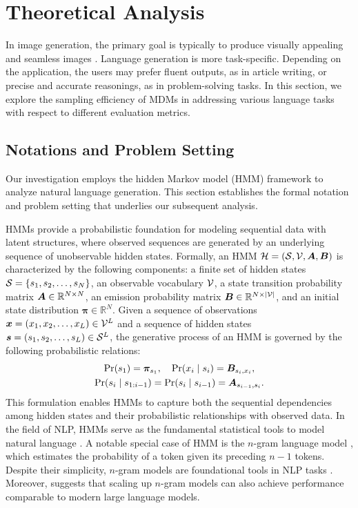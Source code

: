 \vspace{-5pt}
\section{Theoretical Analysis}
\label{sec:theory}
In image generation, the primary goal is typically to produce visually appealing and seamless images \citep{heusel2017gans}. Language generation is more task-specific. Depending on the application, the users may prefer fluent outputs, as in article writing, or precise and accurate reasonings, as in problem-solving tasks. In this section, we explore the sampling efficiency of MDMs in addressing various language tasks with respect to different evaluation metrics. 

\subsection{Notations and Problem Setting}
\label{sec:problem_setting}

Our investigation employs the hidden Markov model (HMM) framework to analyze natural language generation. This section establishes the formal notation and problem setting that underlies our subsequent analysis.

HMMs \citep{eddy1996hidden} provide a probabilistic foundation for modeling sequential data with latent structures, where observed sequences are generated by an underlying sequence of unobservable hidden states. Formally, an HMM ${\mathcal{H}}=({\mathcal{S}},{\mathcal{V}},{\bm{A}},{\bm{B}})$ is characterized by the following components: a finite set of hidden states ${\mathcal{S}} = \{s_1, s_2, \dots, s_N\}$, an observable vocabulary ${\mathcal{V}}$, a state transition probability matrix ${\bm{A}} \in \mathbb{R}^{N \times N}$, an emission probability matrix ${\bm{B}} \in \mathbb{R}^{N \times |{\mathcal{V}}|}$, and an initial state distribution $\boldsymbol{\pi} \in \mathbb{R}^N$. Given a sequence of observations ${\bm{x}} = (x_1, x_2, \dots, x_L) \in {\mathcal{V}}^L$ and a sequence of hidden states ${\bm{s}} = (s_1, s_2, \dots, s_L) \in {\mathcal{S}}^L$, the generative process of an HMM is governed by the following probabilistic relations:
\begin{equation*}
    \begin{gathered}
           \Pr(s_1) = \boldsymbol{\pi}_{s_1}, \quad \Pr(x_i \mid s_i) = {\bm{B}}_{s_i, x_i}, \\
           \Pr(s_i \mid s_{1:i-1}) = \Pr(s_i \mid s_{i-1}) = {\bm{A}}_{s_{i-1}, s_i}.
    \end{gathered}
\end{equation*}
This formulation enables HMMs to capture both the sequential dependencies among hidden states and their probabilistic relationships with observed data. In the field of NLP, HMMs serve as the fundamental statistical tools to model natural language \citep{eddy1996hidden,marti2001using}. A notable special case of HMM is the $n$-gram language model \citep{brown1992class}, which estimates the probability of a token given its preceding \(n-1\) tokens. Despite their simplicity, $n$-gram models are foundational tools in NLP tasks \citep{brown1992class,de2010improved}. Moreover, \citet{liu2024infini} suggests that scaling up $n$-gram models can also achieve performance comparable to modern large language models.

